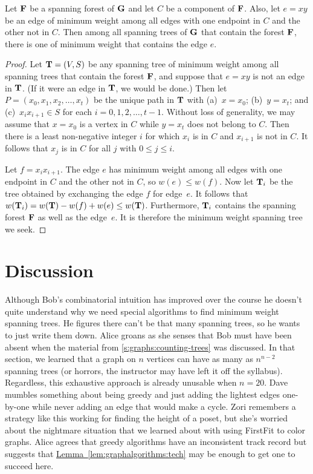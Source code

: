 \begin{lemma}\label{lem:graphalgorithms:tech}
  Let $\mathbf{F}$ be a spanning forest of $\mathbf{G}$ and let $C$ be a component
  of $\mathbf{F}$.  Also, let $e=xy$ be an edge of minimum weight among all
  edges with one endpoint in $C$ and the other not in $C$.  Then among
  all spanning trees of $\mathbf{G}$ that contain the forest $\mathbf{F}$, there
  is one of minimum weight that contains the edge $e$.
\end{lemma}
\begin{proof}
  Let $\mathbf{T}=(V,S)$ be any spanning tree of minimum weight among all
  spanning trees that contain the forest $\mathbf{F}$, and suppose that
  $e=xy$ is not an edge in $\mathbf{T}$. (If it were an edge in $\mathbf{T}$, we
  would be done.) Then let $P=(x_0,x_1,x_2,\dots,x_t)$ be the unique
  path in $\mathbf{T}$ with (a)~$x=x_0$; (b)~$y=x_t$; and (c)~$x_ix_{i+1}\in
  S$ for each $i=0,1,2,\dots,t-1$.  Without loss of generality, we may
  assume that $x=x_0$ is a vertex in $C$ while $y=x_t$ does not
  belong to $C$.  Then there is a
  least non-negative integer $i$ for which $x_i$ is in $C$ and
  $x_{i+1}$ is not in $C$.  It follows that $x_j$ is in $C$ for all $j$ with
  $0\le j\le i$.

  Let $f=x_ix_{i+1}$. The edge $e$ has minimum weight among all edges
  with one endpoint in $C$ and the other not in $C$, so $w(e)\le
  w(f)$.  Now let $\mathbf{T}_i$ be the tree obtained by exchanging the edge
  $f$ for edge~$e$.  It follows that $w(\mathbf{T}_i) = w(\mathbf{T}) - w(f)
  +w(e)\le w(\mathbf{T})$.  Furthermore, $\mathbf{T}_i$ contains the spanning
  forest $\mathbf{F}$ as well as the edge~$e$. It is therefore the minimum
  weight spanning tree we seek.
\end{proof}

\section{Discussion}\label{s:graphalgorithms:discussion}
  Although Bob's combinatorial intuition has improved over the course
  he doesn't quite understand why we need
  special algorithms to find minimum weight spanning trees. He figures
  there can't be that many spanning trees, so he wants to just write
  them down. Alice groans as she senses that Bob must have
  been absent when the material from 
  \autoref{s:graphs:counting-trees}  was discussed.  In that section,
  we learned that a graph on $n$ vertices can have as many as $n^{n-2}$
  spanning trees (or horrors, the instructor may have left it off the
  syllabus).  Regardless, this exhaustive approach is already unusable
  when $n = 20$. Dave mumbles something about being greedy and just adding the
  lightest edges one-by-one while never adding an edge that would make
  a cycle. Zori remembers a strategy like this working for finding
  the height of a poset, but she's worried about the nightmare
  situation that we learned about with using FirstFit to color
  graphs. Alice agrees that greedy algorithms have an inconsistent
  track record but suggests that
  \hyperref[lem:graphalgorithms:tech]{Lemma~\ref*{lem:graphalgorithms:tech}}
  may be enough to get one to succeed here.


